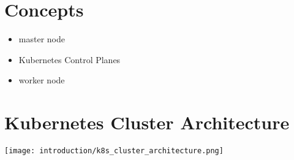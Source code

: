 \section{Concepts}

\begin{itemize}
	\item master node
	\item Kubernetes Control Planes
	\item worker node
\end{itemize}



\section{Kubernetes Cluster Architecture}

\texttt{[image: introduction/k8s\_cluster\_architecture.png]}